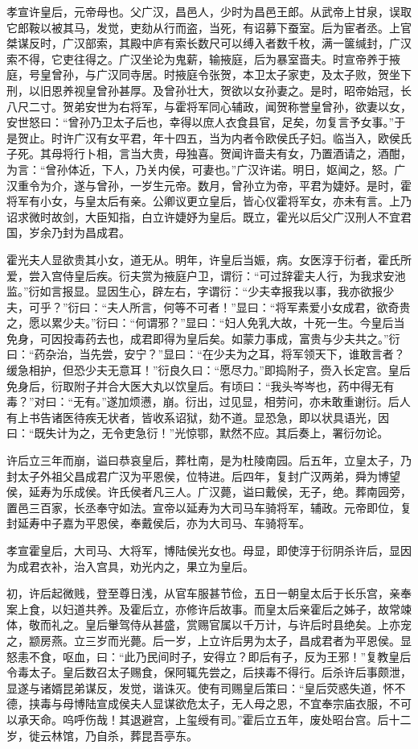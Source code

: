 \documentclass[]{article}
\begin{document}
孝宣许皇后，元帝母也。父广汉，昌邑人，少时为昌邑王郎。从武帝上甘泉，误取它郎鞍以被其马，发觉，吏劾从行而盗，当死，有诏募下蚕室。后为宦者丞。上官桀谋反时，广汉部索，其殿中庐有索长数尺可以缚入者数千枚，满一箧缄封，广汉索不得，它吏往得之。广汉坐论为鬼薪，输掖庭，后为暴室啬夫。时宣帝养于掖庭，号皇曾孙，与广汉同寺居。时掖庭令张贺，本卫太子家吏，及太子败，贺坐下刑，以旧恩养视皇曾孙甚厚。及曾孙壮大，贺欲以女孙妻之。是时，昭帝始冠，长八尺二寸。贺弟安世为右将军，与霍将军同心辅政，闻贺称誉皇曾孙，欲妻以女，安世怒曰：``曾孙乃卫太子后也，幸得以庶人衣食县官，足矣，勿复言予女事。''于是贺止。时许广汉有女平君，年十四五，当为内者令欧侯氏子妇。临当入，欧侯氏子死。其母将行卜相，言当大贵，母独喜。贺闻许啬夫有女，乃置酒请之，酒酣，为言：``曾孙体近，下人，乃关内侯，可妻也。''广汉许诺。明日，妪闻之，怒。广汉重令为介，遂与曾孙，一岁生元帝。数月，曾孙立为帝，平君为婕妤。是时，霍将军有小女，与皇太后有亲。公卿议更立皇后，皆心仪霍将军女，亦未有言。上乃诏求微时故剑，大臣知指，白立许婕妤为皇后。既立，霍光以后父广汉刑人不宜君国，岁余乃封为昌成君。

霍光夫人显欲贵其小女，道无从。明年，许皇后当娠，病。女医淳于衍者，霍氏所爱，尝入宫侍皇后疾。衍夫赏为掖庭户卫，谓衍：``可过辞霍夫人行，为我求安池监。''衍如言报显。显因生心，辟左右，字谓衍：``少夫幸报我以事，我亦欲报少夫，可乎？''衍曰：``夫人所言，何等不可者！''显曰：``将军素爱小女成君，欲奇贵之，愿以累少夫。''衍曰：``何谓邪？''显曰：``妇人免乳大故，十死一生。今皇后当免身，可因投毒药去也，成君即得为皇后矣。如蒙力事成，富贵与少夫共之。''衍曰：``药杂治，当先尝，安宁？''显曰：``在少夫为之耳，将军领天下，谁敢言者？缓急相护，但恐少夫无意耳！''衍良久曰：``愿尽力。''即捣附子，赍入长定宫。皇后免身后，衍取附子并合大医大丸以饮皇后。有顷曰：``我头岑岑也，药中得无有毒？''对曰：``无有。''遂加烦懑，崩。衍出，过见显，相劳问，亦未敢重谢衍。后人有上书告诸医待疾无状者，皆收系诏狱，劾不道。显恐急，即以状具语光，因曰：``既失计为之，无令吏急衍！''光惊鄂，默然不应。其后奏上，署衍勿论。

许后立三年而崩，谥曰恭哀皇后，葬杜南，是为杜陵南园。后五年，立皇太子，乃封太子外祖父昌成君广汉为平恩侯，位特进。后四年，复封广汉两弟，舜为博望侯，延寿为乐成侯。许氏侯者凡三人。广汉薨，谥曰戴侯，无子，绝。葬南园旁，置邑三百家，长丞奉守如法。宣帝以延寿为大司马车骑将军，辅政。元帝即位，复封延寿中子嘉为平恩侯，奉戴侯后，亦为大司马、车骑将军。

孝宣霍皇后，大司马、大将军，博陆侯光女也。母显，即使淳于衍阴杀许后，显因为成君衣补，治入宫具，劝光内之，果立为皇后。

初，许后起微贱，登至尊日浅，从官车服甚节俭，五日一朝皇太后于长乐宫，亲奉案上食，以妇道共养。及霍后立，亦修许后故事。而皇太后亲霍后之姊子，故常竦体，敬而礼之。皇后轝驾侍从甚盛，赏赐官属以千万计，与许后时县绝矣。上亦宠之，颛房燕。立三岁而光薨。后一岁，上立许后男为太子，昌成君者为平恩侯。显怒恚不食，呕血，曰：``此乃民间时子，安得立？即后有子，反为王邪！''复教皇后令毒太子。皇后数召太子赐食，保阿辄先尝之，后挟毒不得行。后杀许后事颇泄，显遂与诸婿昆弟谋反，发觉，谐诛灭。使有司赐皇后策曰：``皇后荧惑失道，怀不德，挟毒与母博陆宣成侯夫人显谋欲危太子，无人母之恩，不宜奉宗庙衣服，不可以承天命。呜呼伤哉！其退避宫，上玺绶有司。''霍后立五年，废处昭台宫。后十二岁，徙云林馆，乃自杀，葬昆吾亭东。
\end{document}
